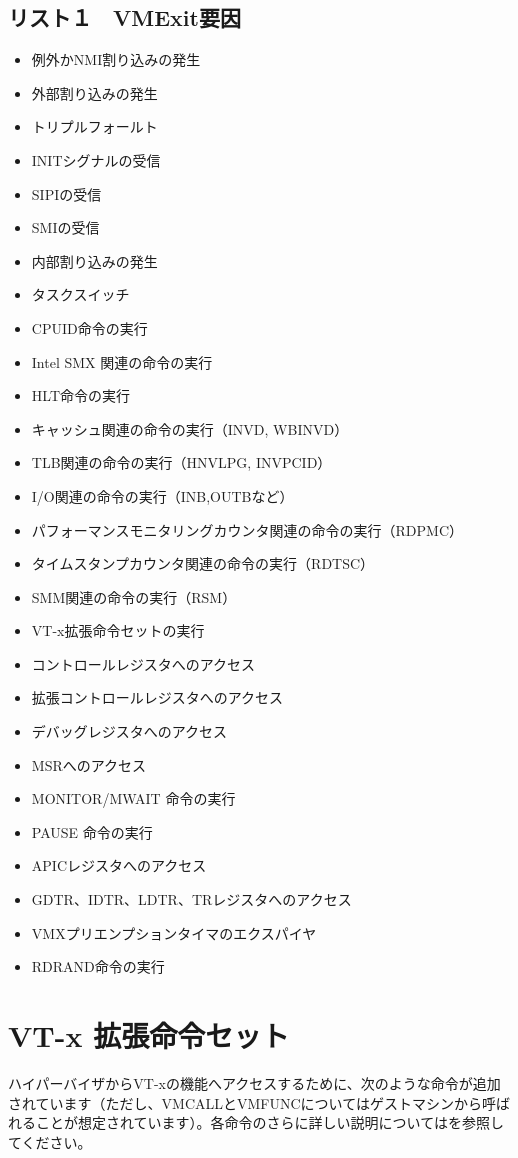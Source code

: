 \documentclass[a4j,12pt]{jarticle}
\begin{document}
\subsection*{リスト１　VMExit要因}
\begin{itemize}
 \item 例外かNMI割り込みの発生
 \item 外部割り込みの発生
 \item トリプルフォールト
 \item INITシグナルの受信
 \item SIPIの受信
 \item SMIの受信
 \item 内部割り込みの発生
 \item タスクスイッチ
 \item CPUID命令の実行
 \item Intel SMX 関連の命令の実行
 \item HLT命令の実行
 \item キャッシュ関連の命令の実行（INVD, WBINVD）
 \item TLB関連の命令の実行（HNVLPG, INVPCID）
 \item I/O関連の命令の実行（INB,OUTBなど）
 \item パフォーマンスモニタリングカウンタ関連の命令の実行（RDPMC）
 \item タイムスタンプカウンタ関連の命令の実行（RDTSC）
 \item SMM関連の命令の実行（RSM）
 \item VT-x拡張命令セットの実行
 \item コントロールレジスタへのアクセス
 \item 拡張コントロールレジスタへのアクセス
 \item デバッグレジスタへのアクセス
 \item MSRへのアクセス
 \item MONITOR/MWAIT 命令の実行
 \item PAUSE 命令の実行
 \item APICレジスタへのアクセス
 \item GDTR、IDTR、LDTR、TRレジスタへのアクセス
 \item VMXプリエンプションタイマのエクスパイヤ
 \item RDRAND命令の実行
\end{itemize}

\section{VT-x 拡張命令セット}
ハイパーバイザからVT-xの機能へアクセスするために、次のような命令が追加されています（ただし、VMCALLとVMFUNCについてはゲストマシンから呼ばれることが想定されています）。各命令のさらに詳しい説明については\cite{SDM}を参照してください。
\end{document}
